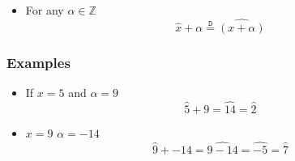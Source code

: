 \documentclass[preview]{standalone}
\begin{document}
\begin{center}
\begin{itemize}
              \item For any $\alpha \in \mathbb{Z}$
                \[
                \widehat{x}  +  \alpha \stackrel{\mathtt{D}}{=} \widehat{\left( x  +  \alpha \right)}
                \]
            \end{itemize}
            \subsubsection*{Examples}
            \begin{itemize}
              \item If $x = 5$ and $\alpha = 9$
                \[
                \widehat{5}  +  9 = \widehat{14} = \widehat{2}
                \] 
              \item $x = 9$ $\alpha = -14$ 
                \[
                \widehat{9}  +   - 14 = \widehat{9  -  14} = \widehat{  - 5} = \widehat{7}
                \]
            \end{itemize}
\end{center}
\end{document}
